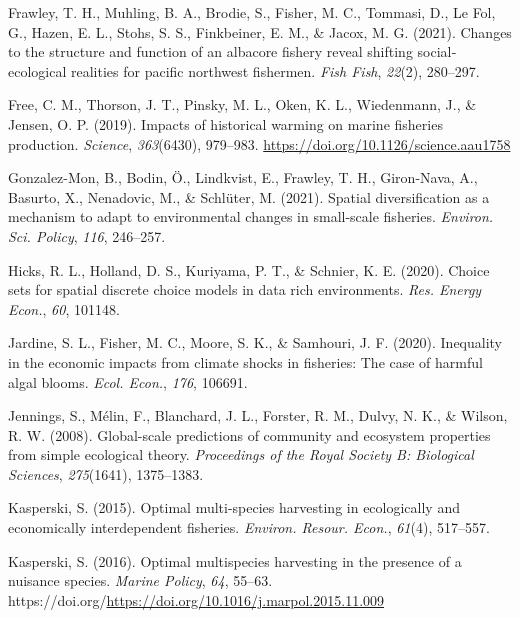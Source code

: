 \documentclass[
  11pt,
]{article}
\newlength{\cslhangindent}
\newenvironment{CSLReferences}[2] %
 {\begin{list}{}{%
  \setlength{\itemindent}{0pt}
  \setlength{\leftmargin}{0pt}
  \setlength{\parsep}{0pt}
  \ifodd #1
   \setlength{\leftmargin}{\cslhangindent}
   \setlength{\itemindent}{-1\cslhangindent}
  \fi
  \setlength{\itemsep}{#2\baselineskip}}}
 {\end{list}}
\begin{document}
\begin{CSLReferences}{1}{0}
Frawley, T. H., Muhling, B. A., Brodie, S., Fisher, M. C., Tommasi, D., Le Fol, G., Hazen, E. L., Stohs, S. S., Finkbeiner, E. M., \& Jacox, M. G. (2021). Changes to the structure and function of an albacore fishery reveal shifting social‐ecological realities for pacific northwest fishermen. \emph{Fish Fish}, \emph{22}(2), 280--297.

Free, C. M., Thorson, J. T., Pinsky, M. L., Oken, K. L., Wiedenmann, J., \& Jensen, O. P. (2019). Impacts of historical warming on marine fisheries production. \emph{Science}, \emph{363}(6430), 979--983. \url{https://doi.org/10.1126/science.aau1758}

Gonzalez-Mon, B., Bodin, Ö., Lindkvist, E., Frawley, T. H., Giron-Nava, A., Basurto, X., Nenadovic, M., \& Schlüter, M. (2021). Spatial diversification as a mechanism to adapt to environmental changes in small-scale fisheries. \emph{Environ. Sci. Policy}, \emph{116}, 246--257.

Hicks, R. L., Holland, D. S., Kuriyama, P. T., \& Schnier, K. E. (2020). Choice sets for spatial discrete choice models in data rich environments. \emph{Res. Energy Econ.}, \emph{60}, 101148.

Jardine, S. L., Fisher, M. C., Moore, S. K., \& Samhouri, J. F. (2020). Inequality in the economic impacts from climate shocks in fisheries: The case of harmful algal blooms. \emph{Ecol. Econ.}, \emph{176}, 106691.

Jennings, S., Mélin, F., Blanchard, J. L., Forster, R. M., Dulvy, N. K., \& Wilson, R. W. (2008). Global-scale predictions of community and ecosystem properties from simple ecological theory. \emph{Proceedings of the Royal Society B: Biological Sciences}, \emph{275}(1641), 1375--1383.

Kasperski, S. (2015). Optimal multi-species harvesting in ecologically and economically interdependent fisheries. \emph{Environ. Resour. Econ.}, \emph{61}(4), 517--557.

Kasperski, S. (2016). Optimal multispecies harvesting in the presence of a nuisance species. \emph{Marine Policy}, \emph{64}, 55--63. https://doi.org/\url{https://doi.org/10.1016/j.marpol.2015.11.009}


\end{CSLReferences}
\end{document}

